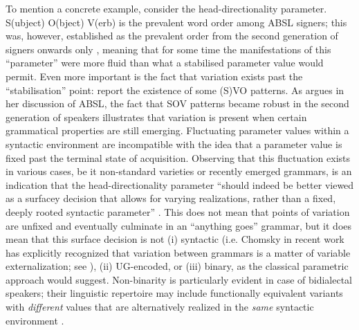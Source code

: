 \documentclass[output=paper]{langsci/langscibook}
\begin{document}
To mention a concrete example, consider the head-directionality parameter.
S(ubject) O(bject) V(erb) is the prevalent word order among \gls{ABSL} signers; this
was, however, established as the prevalent order from the second generation of
signers onwards only \citep{SandlerEtAl2005}, meaning that for some time the
manifestations of this \enquote{parameter} were more fluid than what a stabilised
parameter value would permit. Even more important is the fact that variation
exists past the \enquote{stabilisation} point: \citet[2663]{SandlerEtAl2005} report the
existence of some (S)VO patterns. As \citet{Leivada2015a} argues in her
discussion of \gls{ABSL}, the fact that SOV
patterns became robust in the second generation of speakers illustrates that
variation is present when certain grammatical properties are still emerging.
Fluctuating parameter values within a syntactic environment are incompatible
with the idea that a parameter value is fixed past the terminal state of
acquisition. Observing that this fluctuation exists in various cases, be it
non-standard varieties or recently emerged grammars, is an indication that the
head-directionality parameter “should indeed be better viewed as a surfacey
decision that allows for varying realizations, rather than a fixed, deeply
rooted syntactic parameter” \citep[48]{Leivada2015a}. This does not mean that
points of variation are unfixed and eventually culminate in an “anything goes”
grammar, but it does mean that this surface decision is not (i) syntactic (i.e.
Chomsky in recent work has explicitly recognized that variation between
grammars is a matter of variable externalization; see
\citealt[41]{BerCho2011}), (ii) UG-encoded, or (iii) binary, as the classical
parametric approach would suggest. Non-binarity is particularly evident in case
of bidialectal speakers; their linguistic repertoire may include functionally
equivalent variants \citep{Kroch1994} with \emph{different} values that are
alternatively realized in the \emph{same} syntactic environment
\citep{LeivadaEtAl2017b}.
\end{document}
